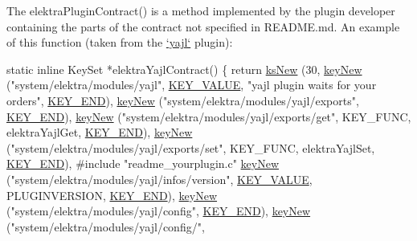 The {\ttfamily elektra\+Plugin\+Contract()} is a method implemented by the plugin developer containing the parts of the contract not specified in {\ttfamily R\+E\+A\+D\+M\+E.\+md}. An example of this function (taken from the \hyperlink{autotoc_md835_src_plugins_yajl_README_md}{`yajl`} plugin)\+:


\begin{DoxyCode}
\textcolor{keyword}{static} \textcolor{keyword}{inline} KeySet *elektraYajlContract()
\{
        \textcolor{keywordflow}{return} \hyperlink{group__keyset_ga671e1aaee3ae9dc13b4834a4ddbd2c3c}{ksNew} (30,
        \hyperlink{group__key_gad23c65b44bf48d773759e1f9a4d43b89}{keyNew} (\textcolor{stringliteral}{"system/elektra/modules/yajl"},
                \hyperlink{group__key_gga9b703ca49f48b482def322b77d3e6bc8ac66e4a49d09212b79f5754ca6db5bd2e}{KEY\_VALUE}, \textcolor{stringliteral}{"yajl plugin waits for your orders"}, \hyperlink{group__key_gga9b703ca49f48b482def322b77d3e6bc8aa8adb6fcb92dec58fb19410eacfdd403}{KEY\_END}),
        \hyperlink{group__key_gad23c65b44bf48d773759e1f9a4d43b89}{keyNew} (\textcolor{stringliteral}{"system/elektra/modules/yajl/exports"}, \hyperlink{group__key_gga9b703ca49f48b482def322b77d3e6bc8aa8adb6fcb92dec58fb19410eacfdd403}{KEY\_END}),
        \hyperlink{group__key_gad23c65b44bf48d773759e1f9a4d43b89}{keyNew} (\textcolor{stringliteral}{"system/elektra/modules/yajl/exports/get"},
                KEY\_FUNC, elektraYajlGet,
                \hyperlink{group__key_gga9b703ca49f48b482def322b77d3e6bc8aa8adb6fcb92dec58fb19410eacfdd403}{KEY\_END}),
        \hyperlink{group__key_gad23c65b44bf48d773759e1f9a4d43b89}{keyNew} (\textcolor{stringliteral}{"system/elektra/modules/yajl/exports/set"},
                KEY\_FUNC, elektraYajlSet,
                \hyperlink{group__key_gga9b703ca49f48b482def322b77d3e6bc8aa8adb6fcb92dec58fb19410eacfdd403}{KEY\_END}),
#include \textcolor{stringliteral}{"readme\_yourplugin.c"}
        \hyperlink{group__key_gad23c65b44bf48d773759e1f9a4d43b89}{keyNew} (\textcolor{stringliteral}{"system/elektra/modules/yajl/infos/version"},
                \hyperlink{group__key_gga9b703ca49f48b482def322b77d3e6bc8ac66e4a49d09212b79f5754ca6db5bd2e}{KEY\_VALUE}, PLUGINVERSION, \hyperlink{group__key_gga9b703ca49f48b482def322b77d3e6bc8aa8adb6fcb92dec58fb19410eacfdd403}{KEY\_END}),
        \hyperlink{group__key_gad23c65b44bf48d773759e1f9a4d43b89}{keyNew} (\textcolor{stringliteral}{"system/elektra/modules/yajl/config"}, \hyperlink{group__key_gga9b703ca49f48b482def322b77d3e6bc8aa8adb6fcb92dec58fb19410eacfdd403}{KEY\_END}),
        \hyperlink{group__key_gad23c65b44bf48d773759e1f9a4d43b89}{keyNew} (\textcolor{stringliteral}{"system/elektra/modules/yajl/config/"},

\end{DoxyCode}
